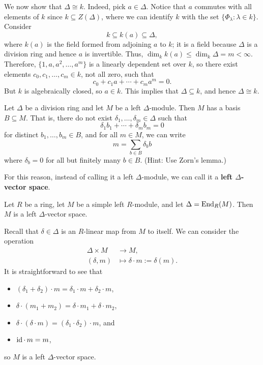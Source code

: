 \begin{pf}
\begin{enumerate}[(a)]
    We now show that $\Delta \cong k$. Indeed, pick $a \in \Delta$. Notice that $a$ commutes 
    with all elements of $k$ since $k \subseteq Z(\Delta)$, where we can identify $k$ with the set 
    $\{\Phi_\lambda : \lambda \in k\}$. Consider 
    \[ k \subseteq k(a) \subseteq \Delta, \]
    where $k(a)$ is the field formed from adjoining $a$ to $k$; it is a field because $\Delta$ 
    is a division ring and hence $a$ is invertible. Thus, $\dim_k k(a) \leq \dim_k \Delta = m < \infty$. 
    Therefore, $\{1, a, a^2, \dots, a^m\}$ is a linearly dependent set over $k$, so there 
    exist elements $c_0, c_1, \dots, c_m \in k$, not all zero, such that 
    \[ c_0 + c_1a + \cdots + c_m a^m = 0. \]
    But $k$ is algebraically closed, so $a \in k$. This implies that $\Delta \subseteq k$, and hence 
    $\Delta \cong k$. \qedhere 
\end{enumerate}
\end{pf}

\begin{exercise}
Let $\Delta$ be a division ring and let $M$ be a left $\Delta$-module. Then $M$ has a basis 
$B \subseteq M$. That is, there do not exist $\delta_1, \dots, \delta_m \in \Delta$ such that 
\[ \delta_1 b_1 + \cdots + \delta_m b_m = 0 \]
for distinct $b_1, \dots, b_m \in B$, and for all $m \in M$, we can write 
\[ m = \sum_{b \in B} \delta_b b \]
where $\delta_b = 0$ for all but finitely many $b \in B$. (Hint: Use Zorn's lemma.)
\end{exercise}

For this reason, instead of calling it a left $\Delta$-module, we can call it a 
{\bf left $\Delta$-vector space}.  

\begin{remark}
Let $R$ be a ring, let $M$ be a simple left $R$-module, and let $\Delta = \operatorname{End}_R(M)$. Then $M$ 
is a left $\Delta$-vector space. 
\end{remark}
\begin{pf}
Recall that $\delta \in \Delta$ is an $R$-linear map from $M$ to itself. We can consider the operation 
\begin{align*}
    \Delta \times M &\to M, \\
    (\delta, m) &\mapsto \delta \cdot m := \delta(m). 
\end{align*}
It is straightforward to see that 
\begin{itemize}
    \item $(\delta_1 + \delta_2) \cdot m = \delta_1 \cdot m + \delta_2 \cdot m$, 
    \item $\delta \cdot (m_1 + m_2) = \delta \cdot m_1 + \delta \cdot m_2$, 
    \item $\delta \cdot (\delta \cdot m) = (\delta_1 \cdot \delta_2) \cdot m$, and 
    \item $\operatorname{id} \cdot \,m = m$,
\end{itemize} so $M$ is a left $\Delta$-vector space. 
\end{pf}

